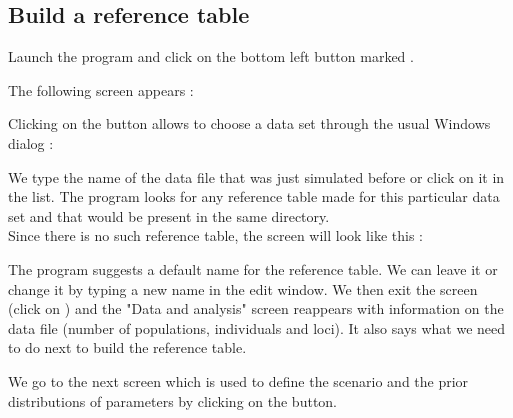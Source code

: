 \newpage
\subsection{Build a reference table}
Launch the program and click on the bottom left button marked .



 The following screen appears :



Clicking on the  button allows to choose a data set through the usual Windows dialog :


We type the name of the data file that was just simulated before or click on it in the list. The program
looks for any reference table made for this particular data set and that would be present in the same directory.\\
\newpage
 Since there is no such reference table, the screen will look like this :


The program suggests a default name for the reference table. We can leave it or change it by typing a new name in the edit window. We then exit the screen (click on ) and the "Data and analysis" screen reappears with information on the data file (number of populations, individuals and loci). It also says what we need to do next to build the reference table.

We go to the next screen which is used to define the scenario and the prior distributions of parameters  by clicking on the \fbox{$>>$} button.


